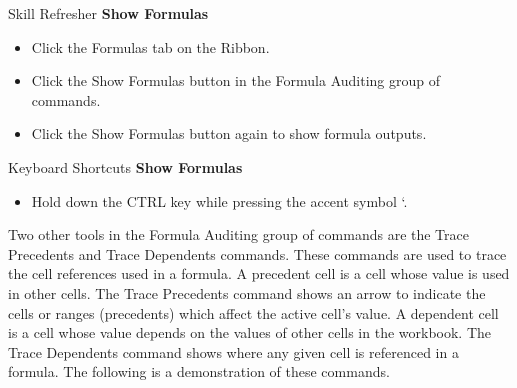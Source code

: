\begin{center}
	\begin{sklbox}{Skill Refresher}
		\textbf{Show Formulas}
		\\
		\begin{itemize}
			\setlength{\itemsep}{0pt}
			\setlength{\parskip}{0pt}
			\setlength{\parsep}{0pt}
			
			\item Click the Formulas tab on the Ribbon.
			\item Click the Show Formulas button in the Formula Auditing group of commands.
			\item Click the Show Formulas button again to show formula outputs.
			
		\end{itemize}
	\end{sklbox}
\end{center}

\begin{center}
	\begin{shtcutbox}{Keyboard Shortcuts}
		\textbf{Show Formulas}
		\\
		\begin{itemize}
			\setlength{\itemsep}{0pt}
			\setlength{\parskip}{0pt}
			\setlength{\parsep}{0pt}
			
			\item Hold down the CTRL key while pressing the accent symbol `.
			
		\end{itemize}
	\end{shtcutbox}
\end{center}

Two other tools in the Formula Auditing group of commands are the Trace Precedents and Trace Dependents commands. These commands are used to trace the cell references used in a formula. A precedent cell is a cell whose value is used in other cells. The Trace Precedents command shows an arrow to indicate the cells or ranges (precedents) which affect the active cell’s value. A dependent cell is a cell whose value depends on the values of other cells in the workbook. The Trace Dependents command shows where any given cell is referenced in a formula. The following is a demonstration of these commands.

